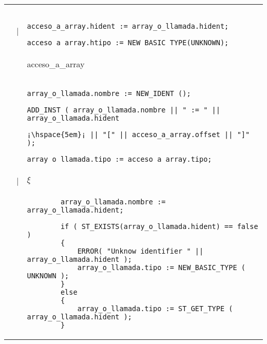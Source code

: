 \begin{tabular}{r c p{}}
							& |				 	& \begin{lstlisting}
            																acceso_a_array.hident := array_o_llamada.hident;
            																acceso_a_array.htipo := NEW_BASIC_TYPE(UNKNOWN);
                    									\end{lstlisting} \\
							&					& acceso\_a\_array \\
							&					& \begin{lstlisting}
            																array_o_llamada.nombre := NEW_IDENT ();
            																ADD_INST ( array_o_llamada.nombre || " := " || array_o_llamada.hident
																		¡\hspace{5em}¡ || "[" || acceso_a_array.offset || "]" );
            																array_o_llamada.tipo := acceso_a_array.tipo;
                    									\end{lstlisting} \\

							& |				 	& $\xi$ \\
							&					& \begin{lstlisting}
        array_o_llamada.nombre := array_o_llamada.hident;

        if ( ST_EXISTS(array_o_llamada.hident) == false )
        {
            ERROR( "Unknow identifier " || array_o_llamada.hident );
            array_o_llamada.tipo := NEW_BASIC_TYPE ( UNKNOWN );
        }
        else
        {
            array_o_llamada.tipo := ST_GET_TYPE ( array_o_llamada.hident );
        }
                    									\end{lstlisting} \\

\end{tabular}


